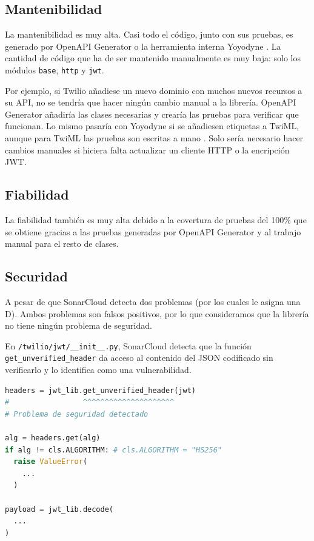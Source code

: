 \documentclass{article}
\begin{document}
\subsection{Mantenibilidad}

La mantenibilidad es muy alta.
Casi todo el código, junto con sus pruebas,
es generado por OpenAPI Generator
\cite{twilio-generated-openapi}
o la herramienta interna Yoyodyne
\cite{twilio-generated-yoyodyne}.
La cantidad de código que ha de ser mantenido manualmente es muy baja:
solo los módulos \verb|base|, \verb|http| y \verb|jwt|.

Por ejemplo,
si Twilio añadiese un nuevo dominio con muchos nuevos recursos a su API,
no se tendría que hacer ningún cambio manual a la librería.
OpenAPI Generator añadiría las clases necesarias
y crearía las pruebas para verificar que funcionan.
Lo mismo pasaría con Yoyodyne si se añadiesen etiquetas a TwiML,
aunque para TwiML las pruebas son escritas a mano
\cite{twilio-twiml-manual-tests}.
Solo sería necesario hacer cambios manuales si hiciera falta actualizar
un cliente HTTP o la encripción JWT.


\subsection{Fiabilidad}

La fiabilidad también es muy alta
debido a la covertura de pruebas del 100\%
que se obtiene gracias a las pruebas generadas por OpenAPI Generator
y al trabajo manual para el resto de clases.

\subsection{Securidad}

A pesar de que SonarCloud detecta dos problemas
(por los cuales le asigna una D).
Ambos problemas son falsos positivos, 
por lo que consideramos que la librería no tiene ningún problema de seguridad.

\hfill

En \verb|/twilio/jwt/__init__.py|,
SonarCloud detecta que la función
\verb|get_unverified_header|
da acceso al contenido del JSON codificado sin verificarlo
y lo identifica como una vulnerabilidad.

\begin{lstlisting}[language=Python]
headers = jwt_lib.get_unverified_header(jwt)
#                 ^^^^^^^^^^^^^^^^^^^^^
# Problema de seguridad detectado

alg = headers.get(alg)
if alg != cls.ALGORITHM: # cls.ALGORITHM = "HS256"
  raise ValueError(
    ...
  )

payload = jwt_lib.decode(
  ...
)
\end{lstlisting}
\end{document}

